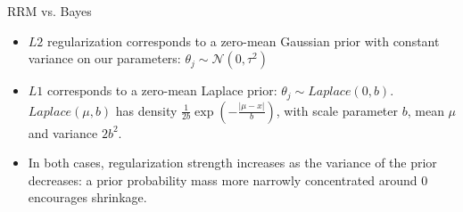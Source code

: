 \begin{vbframe} {RRM vs. Bayes}
\begin{itemize}
  \item $L2$ regularization corresponds to a zero-mean Gaussian prior with 
  constant variance on our parameters:
  $\theta_j \sim \mathcal{N}(0, \tau^2)$ 
  \item $L1$ corresponds to a zero-mean Laplace prior: 
  $\theta_j \sim \mathit{Laplace}(0,b)$.
  $\mathit{Laplace}(\mu, b)$ has density $\frac{1}{2b}\exp(-\frac{|\mu-x|}{b})$, 
  with scale parameter $b$, mean $\mu$ and variance $2b^2$.
  \item In both cases, regularization strength increases as the 
  variance of the prior decreases: a prior probability mass more narrowly 
  concentrated around 0 encourages shrinkage.
\end{itemize}
  
\end{vbframe}


